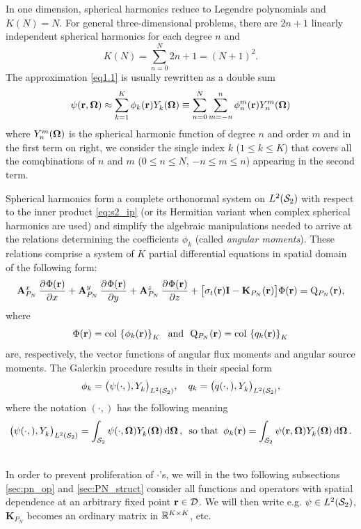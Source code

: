 In one dimension, spherical harmonics reduce to 
Legendre polynomials and $ K(N) = N$.
For general three-dimensional problems, there are $2n + 1$ linearly independent spherical harmonics for each degree $n$ 
and 
$$ 
	K(N) = \sum_{n=0}^{N} 2n + 1 = (N+1)^2.
$$
%
The approximation \eqref{eq1.1} is usually rewritten as a double sum
\begin{equation}\label{eq:pn_approx}
	\psi(\br,\bomega) \approx \sum_{k=1}^{ K} \phi_k(\br)\Y{k}{}(\bomega) \equiv
	\suma[n]{0}{N}\suma[m]{-n}{n}\angmom{n}{m}(\br)\Y{n}{m}(\bomega)
\end{equation}
where $\Y{n}{m}(\bomega)$ is the spherical harmonic function of degree $n$ and order $m$
and in the first term on right, we consider the single index $k$ ($1 \leq k \leq  K$) that covers all the comqbinations
of $n$ and $m$ ($0 \leq n \leq N$, $-n\leq m \leq n$) appearing in the second term.

Spherical harmonics form a complete orthonormal system on $\Lp[2](\Sphere)$ with respect to the inner product
\eqref{eq:s2_ip} (or its Hermitian variant when complex spherical harmonics are used) and simplify the algebraic
manipulations needed to arrive at the relations determining the coefficients $\phi_k$ (called \textit{angular moments}).
These relations comprise a system of $K$
partial differential equations in spatial domain 
of the following form:
\begin{equation}\label{eq:pn1}
	\mat{A}^x_{P_N}\,\pd{\Phi(\br)}{x} + \mat{A}^y_{P_N}\,\pd{\Phi(\br)}{y} + \mat{A}^z_{P_N}\,\pd{\Phi(\br)}{z} +
	\bigl[\sigma_t(\br)\mat{I} - \mathbf{K}_{P_N}(\br)\bigr]\Phi(\br) = \mathrm{Q}_{P_N}(\br),
\end{equation}
where 
\begin{equation}\label{eq:pn_vectors}
	\Phi(\br) = \col\left\{\phi_k(\br)\right\}_{\idxset{K}} \ \text{ and }\ 
	\mathrm{Q}_{P_N}(\br) = \col\left\{q_k(\br)\right\}_{\idxset{K}}
\end{equation}
are, respectively, the vector functions of angular flux
moments and angular source moments.
The
Galerkin procedure results in their special form
\begin{equation}\label{eq:pn_vars}
	\phi_k = \ipsl{\psi(\cdot,)}{\Y{k}{}},\quad q_k = \ipsl{q(\cdot,)}{\Y{k}{}},
\end{equation}
where the notation $(\cdot,)$ has the following meaning
$$
 	\ipsl{\psi(\cdot,)}{\Y{k}{}} = \intA{\psi(\cdot,\bomega) \Y{k}{}(\bomega)},\ \, \mbox{so
 	that}\ \, \phi_k(\br) = \intA{\psi(\br,\bomega) \Y{k}{}(\bomega)}. 
$$
\begin{remark}\mbox{}\\
In order to prevent proliferation of $\cdot$'s, we will in the two following subsections
\ref{sec:pn_op} and \ref{sec:PN_struct} consider all functions and operators with spatial dependence at an arbitrary 
fixed point $\br\in\VV$. We will then write e.g. $\psi\in\Lp[2](\Sphere)$, $\mathbf{K}_{P_N}$ becomes an ordinary matrix
in $\R[K\times K]$, etc.
\end{remark}

